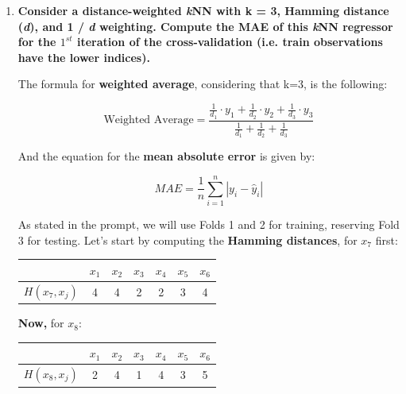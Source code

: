 \documentclass[12pt]{article}
\begin{document}
\begin{enumerate}[leftmargin=\labelsep]
\begin{enumerate}
    \item \textbf{Consider a distance-weighted \textit{k}NN with k = 3, Hamming distance (\textit{d}), and 1 / \textit{d} weighting.
          Compute the MAE of this \textit{k}NN regressor for the $1^{st}$ iteration of the cross-validation (i.e. train
          observations have the lower indices).}

          \vskip 0.3cm

          The formula for \textbf{weighted average}, considering that k=3, is the following:

          \begin{equation}\label{exI2-a-WA}
            \text{Weighted Average} = \frac{{\frac{1}{{d_1}} \cdot y_1 + \frac{1}{{d_2}} \cdot y_2 + \frac{1}{{d_3}} \cdot y_3}}{{\frac{1}{{d_1}} + \frac{1}{{d_2}} + \frac{1}{{d_3}}}}
          \end{equation}

          And the equation for the \textbf{mean absolute error} is given by:

          \begin{equation}\label{exI2-a-MAE}
              MAE = \frac{1}{n} \sum_{i=1}^{n} \left| y_i - \hat{y}_i \right|
          \end{equation}

          As stated in the prompt, we will use Folds 1 and 2 for training, reserving Fold 3 for testing. Let's start by computing
           the \textbf{Hamming distances}, for $x_7$ first:

           \begin{center}
            \begin{tabular}{c|cccccc}
                               & \(x_1\) & \(x_2\) & \(x_3\) & \(x_4\) & \(x_5\) &\(x_6\) \\
                \hline
                \(H(x_7,x_j)\) & 4 & 4 & 2 & 2 & 3 & 4 \\
            \end{tabular}
          \end{center}

          \textbf{Now,} for $x_8$:

          \begin{center}
            \begin{tabular}{c|cccccc}
                               & \(x_1\) & \(x_2\) & \(x_3\) & \(x_4\) & \(x_5\) &\(x_6\) \\
                \hline
                \(H(x_8,x_j)\) & 2 & 4 & 1 & 4 & 3 & 5 \\
            \end{tabular}
          \end{center}


\end{enumerate}
\end{enumerate}
\end{document}
